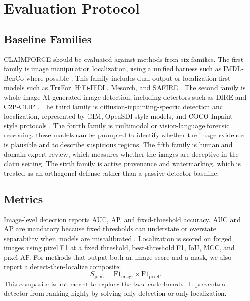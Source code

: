 \section{Evaluation Protocol}
\label{sec:protocol}

\subsection{Baseline Families}

CLAIMFORGE should be evaluated against methods from six families. The first family is image manipulation localization, using a unified harness such as IMDL-BenCo where possible \citep{ma2024imdldbenco}. This family includes dual-output or localization-first models such as TruFor, HiFi-IFDL, Mesorch, and SAFIRE \citep{guillaro2022trufor,guo2023hifi,zhu2024mesorch,kwon2024safire}. The second family is whole-image AI-generated image detection, including detectors such as DIRE and C2P-CLIP \citep{wang2023dire,tan2024c2pclip}. The third family is diffusion-inpainting-specific detection and localization, represented by GIM, OpenSDI-style models, and COCO-Inpaint-style protocols \citep{chen2024gim,wang2025opensdi,yan2025cocoinpaint}. The fourth family is multimodal or vision-language forensic reasoning: these models can be prompted to identify whether the image evidence is plausible and to describe suspicious regions. The fifth family is human and domain-expert review, which measures whether the images are deceptive in the claim setting. The sixth family is active provenance and watermarking, which is treated as an orthogonal defense rather than a passive detector baseline.

\subsection{Metrics}

Image-level detection reports AUC, AP, and fixed-threshold accuracy. AUC and AP are mandatory because fixed thresholds can understate or overstate separability when models are miscalibrated \citep{yang2026calibration}. Localization is scored on forged images using pixel F1 at a fixed threshold, best-threshold F1, IoU, MCC, and pixel AP. For methods that output both an image score and a mask, we also report a detect-then-localize composite:
\[
S_{\mathrm{joint}} = \mathrm{F1}_{\mathrm{image}} \times \mathrm{F1}_{\mathrm{pixel}}.
\]
This composite is not meant to replace the two leaderboards. It prevents a detector from ranking highly by solving only detection or only localization.

